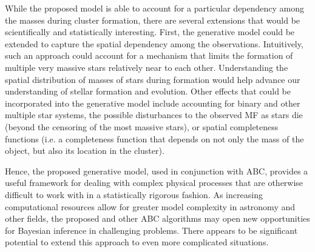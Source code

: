 \documentclass[ejs]{imsart}
\numberwithin{equation}{section}
\theoremstyle{plain}
\begin{document}
While the proposed model is able to account for a particular dependency among the masses during cluster formation, there are several extensions that would be scientifically and statistically interesting.   First, the generative model could be extended to capture the spatial dependency among the observations.
Intuitively, such an approach could account for a mechanism that limits the formation of multiple very massive stars relatively near to each other.  
%
Understanding the spatial distribution of masses of stars during formation would help advance our understanding of stellar formation and evolution.  
%
Other effects that could be incorporated into the generative model include accounting for binary and other multiple star systems, the possible disturbances to the observed MF as stars die (beyond the censoring of the most massive stars), or spatial completeness functions (i.e. a completeness function that depends on not only the mass of the object, but also its location in the cluster).  

Hence, the proposed generative model, used in conjunction with ABC, provides a useful framework for 
dealing with complex physical processes that are otherwise difficult to work with in a 
statistically rigorous fashion. As increasing computational resources allow for greater model 
complexity in astronomy and other fields, the proposed and other ABC 
algorithms may open new opportunities for Bayesian inference in challenging problems. There appears to
be significant potential to extend this approach to even more complicated situations.


\appendix
\end{document}
